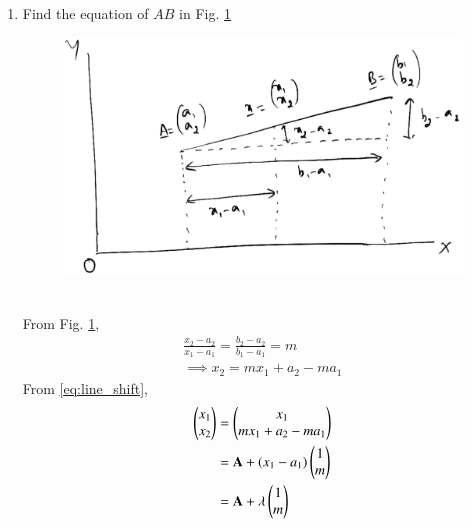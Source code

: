 \documentclass[journal,12pt,twocolumn]{IEEEtran}
\renewcommand\thesection{\arabic{section}}
\begin{document}
\begin{enumerate}[label=\thesection.\arabic*
,ref=\thesection.\theenumi]
Let $\vec{x}=\myvec{x_1\\x_2}$ be any point on $OA$.
Then, using similar triangles,
\begin{align}
\frac{x_2}{x_1} &= \frac{a_2}{a_1} = m
\\
\implies x_2 &=  m x_1
\end{align}
where $m$ is known as the slope of the line. Thus, the equation of the line is
\begin{align}
\vec{x} = \myvec{x_1\\m x_1} = x_1 \myvec{1 \\ m}
\end{align}
In general, the above equation is written as
\begin{align}
\label{eq:homog}
\vec{x} = \myvec{x_1\\m x_1} = \lambda \myvec{1 \\ m}
\end{align}


\item Find the equation of $AB$ in Fig. \ref{fig:line_nhomog}
\begin{figure}
\centering
\includegraphics[width=\columnwidth]{./figs/line_nhomog.eps}
\caption{}
\label{fig:line_nhomog}
\end{figure}
\\
\solution 
From Fig. \ref{fig:line_nhomog}, 
%
\begin{align}
\frac{x_2-a_2}{x_1-a_1} = \frac{b_2-a_2}{b_1-a_1} = m
\\
\implies x_2 = m x_1 + a_2-ma_1
\label{eq:line_shift}
\end{align}
%
From \eqref{eq:line_shift},
\begin{align}
\begin{pmatrix}x_1 \\ x_2\end{pmatrix} &= 
\begin{pmatrix}x_1 \\   m x_1 + a_2-ma_1
\end{pmatrix} 
\\
&=\mathbf{A} + \left(x_1-a_1\right)  \begin{pmatrix}1 \\ m\end{pmatrix}
\\
&=\mathbf{A} + \lambda  \begin{pmatrix}1 \\ m\end{pmatrix}
\label{eq:nhomog}
\end{align}


\end{enumerate}
\end{document}
